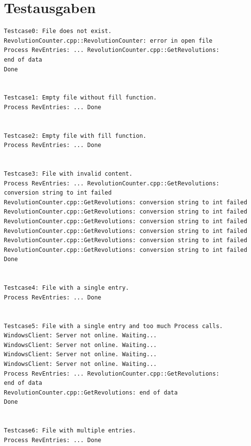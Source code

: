 \documentclass[12pt,a4paper]{article}
\begin{document}
\section {Testausgaben} 

\begin {verbatim}
Testcase0: File does not exist.
RevolutionCounter.cpp::RevolutionCounter: error in open file
Process RevEntries: ... RevolutionCounter.cpp::GetRevolutions: 
end of data
Done


Testcase1: Empty file without fill function.
Process RevEntries: ... Done


Testcase2: Empty file with fill function.
Process RevEntries: ... Done


Testcase3: File with invalid content.
Process RevEntries: ... RevolutionCounter.cpp::GetRevolutions: 
conversion string to int failed
RevolutionCounter.cpp::GetRevolutions: conversion string to int failed
RevolutionCounter.cpp::GetRevolutions: conversion string to int failed
RevolutionCounter.cpp::GetRevolutions: conversion string to int failed
RevolutionCounter.cpp::GetRevolutions: conversion string to int failed
RevolutionCounter.cpp::GetRevolutions: conversion string to int failed
RevolutionCounter.cpp::GetRevolutions: conversion string to int failed
Done


Testcase4: File with a single entry.
Process RevEntries: ... Done


Testcase5: File with a single entry and too much Process calls.
WindowsClient: Server not online. Waiting...
WindowsClient: Server not online. Waiting...
WindowsClient: Server not online. Waiting...
WindowsClient: Server not online. Waiting...
Process RevEntries: ... RevolutionCounter.cpp::GetRevolutions: 
end of data
RevolutionCounter.cpp::GetRevolutions: end of data
Done


Testcase6: File with multiple entries.
Process RevEntries: ... Done
\end {verbatim}
\end{document}
